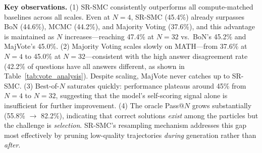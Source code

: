 \documentclass{article}
\begin{document}
\noindent\textbf{Key observations.} (1) SR-SMC consistently outperforms all compute-matched baselines across all scales. Even at $N=4$, SR-SMC (45.4\%) already surpasses BoN (44.6\%), MCMC (44.2\%), and Majority Voting (37.6\%), and this advantage is maintained as $N$ increases---reaching 47.4\% at $N=32$ vs.\ BoN's 45.2\% and MajVote's 45.0\%. (2) Majority Voting scales slowly on MATH---from 37.6\% at $N=4$ to 45.0\% at $N=32$---consistent with the high answer disagreement rate (42.2\% of questions have all answers different, as shown in Table~\ref{tab:vote_analysis}). Despite scaling, MajVote never catches up to SR-SMC. (3) Best-of-$N$ saturates quickly: performance plateaus around 45\% from $N=4$ to $N=32$, suggesting that the model's self-scoring signal alone is insufficient for further improvement. (4) The oracle Pass@$N$ grows substantially (55.8\% $\rightarrow$ 82.2\%), indicating that correct solutions \emph{exist} among the particles but the challenge is \emph{selection}. SR-SMC's resampling mechanism addresses this gap most effectively by pruning low-quality trajectories \emph{during} generation rather than \emph{after}.
\end{document}
